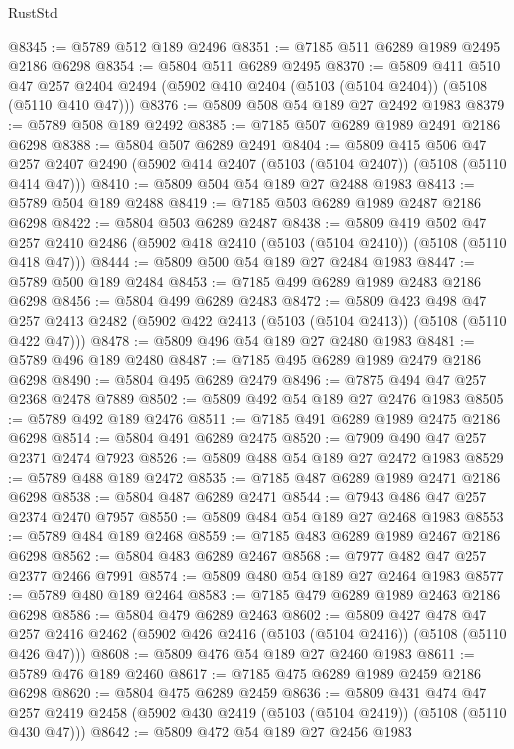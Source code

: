 \begin{lexlean}{RustStd}
\begin{coremodule}
@8345 := @5789 @512 @189 @2496
@8351 := @7185 @511 @6289 @1989 @2495 @2186 @6298
@8354 := @5804 @511 @6289 @2495
@8370 := @5809
    @411
    @510
    @47
    @257
    @2404
    @2494
    (@5902 @410 @2404 (@5103 (@5104 @2404)) (@5108 (@5110 @410 @47)))
@8376 := @5809 @508 @54 @189 @27 @2492 @1983
@8379 := @5789 @508 @189 @2492
@8385 := @7185 @507 @6289 @1989 @2491 @2186 @6298
@8388 := @5804 @507 @6289 @2491
@8404 := @5809
    @415
    @506
    @47
    @257
    @2407
    @2490
    (@5902 @414 @2407 (@5103 (@5104 @2407)) (@5108 (@5110 @414 @47)))
@8410 := @5809 @504 @54 @189 @27 @2488 @1983
@8413 := @5789 @504 @189 @2488
@8419 := @7185 @503 @6289 @1989 @2487 @2186 @6298
@8422 := @5804 @503 @6289 @2487
@8438 := @5809
    @419
    @502
    @47
    @257
    @2410
    @2486
    (@5902 @418 @2410 (@5103 (@5104 @2410)) (@5108 (@5110 @418 @47)))
@8444 := @5809 @500 @54 @189 @27 @2484 @1983
@8447 := @5789 @500 @189 @2484
@8453 := @7185 @499 @6289 @1989 @2483 @2186 @6298
@8456 := @5804 @499 @6289 @2483
@8472 := @5809
    @423
    @498
    @47
    @257
    @2413
    @2482
    (@5902 @422 @2413 (@5103 (@5104 @2413)) (@5108 (@5110 @422 @47)))
@8478 := @5809 @496 @54 @189 @27 @2480 @1983
@8481 := @5789 @496 @189 @2480
@8487 := @7185 @495 @6289 @1989 @2479 @2186 @6298
@8490 := @5804 @495 @6289 @2479
@8496 := @7875 @494 @47 @257 @2368 @2478 @7889
@8502 := @5809 @492 @54 @189 @27 @2476 @1983
@8505 := @5789 @492 @189 @2476
@8511 := @7185 @491 @6289 @1989 @2475 @2186 @6298
@8514 := @5804 @491 @6289 @2475
@8520 := @7909 @490 @47 @257 @2371 @2474 @7923
@8526 := @5809 @488 @54 @189 @27 @2472 @1983
@8529 := @5789 @488 @189 @2472
@8535 := @7185 @487 @6289 @1989 @2471 @2186 @6298
@8538 := @5804 @487 @6289 @2471
@8544 := @7943 @486 @47 @257 @2374 @2470 @7957
@8550 := @5809 @484 @54 @189 @27 @2468 @1983
@8553 := @5789 @484 @189 @2468
@8559 := @7185 @483 @6289 @1989 @2467 @2186 @6298
@8562 := @5804 @483 @6289 @2467
@8568 := @7977 @482 @47 @257 @2377 @2466 @7991
@8574 := @5809 @480 @54 @189 @27 @2464 @1983
@8577 := @5789 @480 @189 @2464
@8583 := @7185 @479 @6289 @1989 @2463 @2186 @6298
@8586 := @5804 @479 @6289 @2463
@8602 := @5809
    @427
    @478
    @47
    @257
    @2416
    @2462
    (@5902 @426 @2416 (@5103 (@5104 @2416)) (@5108 (@5110 @426 @47)))
@8608 := @5809 @476 @54 @189 @27 @2460 @1983
@8611 := @5789 @476 @189 @2460
@8617 := @7185 @475 @6289 @1989 @2459 @2186 @6298
@8620 := @5804 @475 @6289 @2459
@8636 := @5809
    @431
    @474
    @47
    @257
    @2419
    @2458
    (@5902 @430 @2419 (@5103 (@5104 @2419)) (@5108 (@5110 @430 @47)))
@8642 := @5809 @472 @54 @189 @27 @2456 @1983

\end{coremodule}
\end{lexlean}
